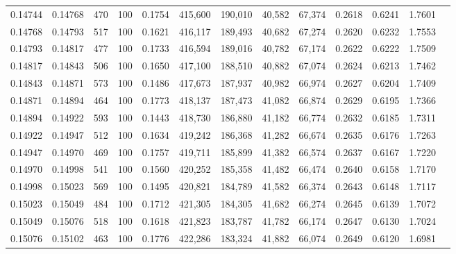 \begin{tabular}{rrrrrrrrrrrrr}
0.14744 & 0.14768 &   470 & 100 &                                     0.1754 & 415,600 & 190,010 &  40,582 &  67,374 & 0.2618 & 0.6241 & 1.7601 \\
0.14768 & 0.14793 &   517 & 100 &                                     0.1621 & 416,117 & 189,493 &  40,682 &  67,274 & 0.2620 & 0.6232 & 1.7553 \\
0.14793 & 0.14817 &   477 & 100 &                                     0.1733 & 416,594 & 189,016 &  40,782 &  67,174 & 0.2622 & 0.6222 & 1.7509 \\
0.14817 & 0.14843 &   506 & 100 &                                     0.1650 & 417,100 & 188,510 &  40,882 &  67,074 & 0.2624 & 0.6213 & 1.7462 \\
0.14843 & 0.14871 &   573 & 100 &                                     0.1486 & 417,673 & 187,937 &  40,982 &  66,974 & 0.2627 & 0.6204 & 1.7409 \\
0.14871 & 0.14894 &   464 & 100 &                                     0.1773 & 418,137 & 187,473 &  41,082 &  66,874 & 0.2629 & 0.6195 & 1.7366 \\
0.14894 & 0.14922 &   593 & 100 &                                     0.1443 & 418,730 & 186,880 &  41,182 &  66,774 & 0.2632 & 0.6185 & 1.7311 \\
0.14922 & 0.14947 &   512 & 100 &                                     0.1634 & 419,242 & 186,368 &  41,282 &  66,674 & 0.2635 & 0.6176 & 1.7263 \\
0.14947 & 0.14970 &   469 & 100 &                                     0.1757 & 419,711 & 185,899 &  41,382 &  66,574 & 0.2637 & 0.6167 & 1.7220 \\
0.14970 & 0.14998 &   541 & 100 &                                     0.1560 & 420,252 & 185,358 &  41,482 &  66,474 & 0.2640 & 0.6158 & 1.7170 \\
0.14998 & 0.15023 &   569 & 100 &                                     0.1495 & 420,821 & 184,789 &  41,582 &  66,374 & 0.2643 & 0.6148 & 1.7117 \\
0.15023 & 0.15049 &   484 & 100 &                                     0.1712 & 421,305 & 184,305 &  41,682 &  66,274 & 0.2645 & 0.6139 & 1.7072 \\
0.15049 & 0.15076 &   518 & 100 &                                     0.1618 & 421,823 & 183,787 &  41,782 &  66,174 & 0.2647 & 0.6130 & 1.7024 \\
0.15076 & 0.15102 &   463 & 100 &                                     0.1776 & 422,286 & 183,324 &  41,882 &  66,074 & 0.2649 & 0.6120 & 1.6981 \\

\end{tabular}
